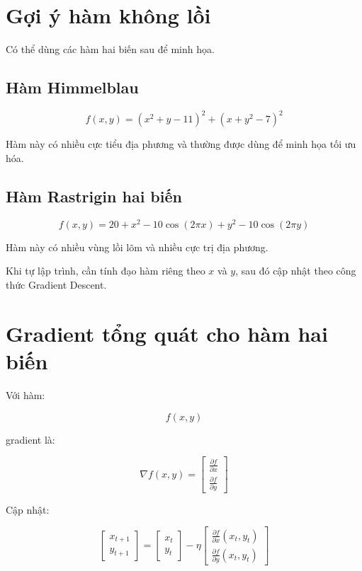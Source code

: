 \documentclass[12pt,a4paper]{report}
\begin{document}
\section{Gợi ý hàm không lồi}

Có thể dùng các hàm hai biến sau để minh họa.

\subsection{Hàm Himmelblau}

\[
    f(x,y)
    =
    (x^2+y-11)^2
    +
    (x+y^2-7)^2
\]

Hàm này có nhiều cực tiểu địa phương và thường được dùng để minh họa tối ưu hóa.

\subsection{Hàm Rastrigin hai biến}

\[
    f(x,y)
    =
    20
    +
    x^2
    -
    10\cos(2\pi x)
    +
    y^2
    -
    10\cos(2\pi y)
\]

Hàm này có nhiều vùng lồi lõm và nhiều cực trị địa phương.

\begin{luuy}
Khi tự lập trình, cần tính đạo hàm riêng theo $x$ và $y$, sau đó cập nhật theo công thức Gradient Descent.
\end{luuy}

\section{Gradient tổng quát cho hàm hai biến}

Với hàm:

\[
    f(x,y)
\]

gradient là:

\[
    \nabla f(x,y)
    =
    \begin{bmatrix}
    \frac{\partial f}{\partial x}\\
    \frac{\partial f}{\partial y}
    \end{bmatrix}
\]

Cập nhật:

\[
    \begin{bmatrix}
    x_{t+1}\\
    y_{t+1}
    \end{bmatrix}
    =
    \begin{bmatrix}
    x_t\\
    y_t
    \end{bmatrix}
    -
    \eta
    \begin{bmatrix}
    \frac{\partial f}{\partial x}(x_t,y_t)\\
    \frac{\partial f}{\partial y}(x_t,y_t)
    \end{bmatrix}
\]
\end{document}

